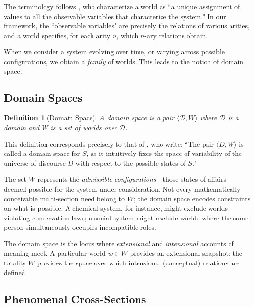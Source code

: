 \documentclass[12pt,a4paper]{article}
\newtheorem{definition}{Definition}[section]
\newcommand{\domain}{\mathcal{D}}
\begin{document}
The terminology follows \citet{guarino2009}, who characterize a world as ``a unique assignment of values to all the observable variables that characterize the system." In our framework, the ``observable variables" are precisely the relations of various arities, and a world specifies, for each arity $n$, which $n$-ary relations obtain.

When we consider a system evolving over time, or varying across possible configurations, we obtain a \emph{family} of worlds. This leads to the notion of domain space.

\subsection{Domain Spaces}

\begin{definition}[Domain Space]
\label{def:domain-space}
A \emph{domain space} is a pair $\langle \domain, W \rangle$ where $\domain$ is a domain and $W$ is a set of worlds over $\domain$.
\end{definition}

This definition corresponds precisely to that of \citet{guarino2009}, who write: ``The pair $\langle D, W \rangle$ is called a domain space for $S$, as it intuitively fixes the space of variability of the universe of discourse $D$ with respect to the possible states of $S$."

The set $W$ represents the \emph{admissible configurations}---those states of affairs deemed possible for the system under consideration. Not every mathematically conceivable multi-section need belong to $W$; the domain space encodes constraints on what is possible. A chemical system, for instance, might exclude worlds violating conservation laws; a social system might exclude worlds where the same person simultaneously occupies incompatible roles.

The domain space is the locus where \emph{extensional} and \emph{intensional} accounts of meaning meet. A particular world $w \in W$ provides an extensional snapshot; the totality $W$ provides the space over which intensional (conceptual) relations are defined.

\subsection{Phenomenal Cross-Sections}
\end{document}
